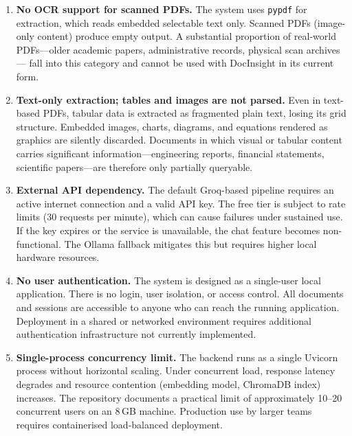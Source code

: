 \begin{enumerate}[leftmargin=1.8em, itemsep=6pt]

    \item \textbf{No OCR support for scanned PDFs.}
    The system uses \texttt{pypdf} for extraction, which reads embedded
    selectable text only. Scanned PDFs (image-only content) produce
    empty output. A substantial proportion of real-world PDFs---older
    academic papers, administrative records, physical scan archives---
    fall into this category and cannot be used with DocInsight in its
    current form.

    \item \textbf{Text-only extraction; tables and images are not parsed.}
    Even in text-based PDFs, tabular data is extracted as fragmented
    plain text, losing its grid structure. Embedded images, charts,
    diagrams, and equations rendered as graphics are silently discarded.
    Documents in which visual or tabular content carries significant
    information---engineering reports, financial statements, scientific
    papers---are therefore only partially queryable.

    \item \textbf{External API dependency.}
    The default Groq-based pipeline requires an active internet connection
    and a valid API key. The free tier is subject to rate limits
    (30 requests per minute), which can cause failures under sustained use.
    If the key expires or the service is unavailable, the chat feature
    becomes non-functional. The Ollama fallback mitigates this but
    requires higher local hardware resources.

    \item \textbf{No user authentication.}
    The system is designed as a single-user local application. There is
    no login, user isolation, or access control. All documents and sessions
    are accessible to anyone who can reach the running application.
    Deployment in a shared or networked environment requires additional
    authentication infrastructure not currently implemented.

    \item \textbf{Single-process concurrency limit.}
    The backend runs as a single Uvicorn process without horizontal scaling.
    Under concurrent load, response latency degrades and resource contention
    (embedding model, ChromaDB index) increases. The repository documents
    a practical limit of approximately 10--20 concurrent users on an 8\,GB
    machine. Production use by larger teams requires containerised
    load-balanced deployment.

\end{enumerate}